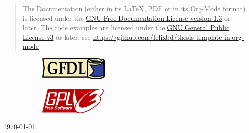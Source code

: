 \begin{titlepage}
	\begin{center}
		\vspace{.5cm}

		\begin{quote}
			{ \small
				The Documentation (either in its \LaTeX, PDF or in its Org-Mode format) is licensed under the
				\href{https://www.gnu.org/licenses/fdl-1.3.txt}{GNU Free Documentation License version 1.3}
				or later.  The code examples are licensed under the
				\href{https://www.gnu.org/licenses/gpl-3.0.txt}{GNU General Public License v3}
				or later. see \url{https://github.com/felixbd/thesis-template-in-org-mode}
			}
		\end{quote}

		\begin{figure}[!hbt]
			\centering
			\begin{subfigure}{0.49\textwidth}
				\centering
				\includegraphics[height=.5cm]{images/gfdl.png}
				\label{fig:left1}
			\end{subfigure}
			\begin{subfigure}{0.49\textwidth}
				\centering
				\includegraphics[height=.5cm]{images/gplv3.png}
				\label{fig:right1}
			\end{subfigure}
			\label{fig:combined1}
		\end{figure}

		\vspace{.2cm}


		{\large \date \to \today}
	\end{center}
\end{titlepage}

\restoregeometry
